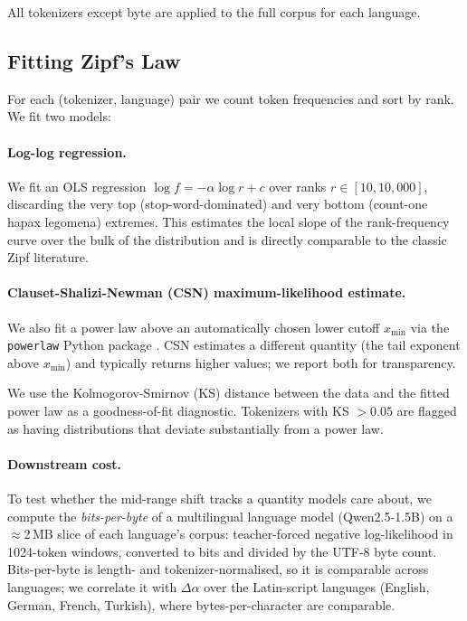 \documentclass{article}
\begin{document}
All tokenizers except byte are applied to the full corpus for each language.

\subsection{Fitting Zipf's Law}
\label{sec:fitting}

For each (tokenizer, language) pair we count token frequencies and sort by rank. We
fit two models:

\paragraph{Log-log regression.} We fit an OLS regression
$\log f = -\alpha \log r + c$ over ranks $r \in [10, 10{,}000]$, discarding the very
top (stop-word-dominated) and very bottom (count-one hapax legomena) extremes. This
estimates the local slope of the rank-frequency curve over the bulk of the distribution
and is directly comparable to the classic Zipf literature.

\paragraph{Clauset-Shalizi-Newman (CSN) maximum-likelihood estimate.} We also fit a
power law above an automatically chosen lower cutoff $x_{\min}$ via the \texttt{powerlaw}
Python package \citep{clauset2009}. CSN estimates a different quantity (the tail exponent
above $x_{\min}$) and typically returns higher values; we report both for transparency.

We use the Kolmogorov-Smirnov (KS) distance between the data and the fitted power law
as a goodness-of-fit diagnostic. Tokenizers with KS $> 0.05$ are flagged as having
distributions that deviate substantially from a power law.

\paragraph{Downstream cost.} To test whether the mid-range shift tracks a quantity
models care about, we compute the \emph{bits-per-byte} of a multilingual language model
(Qwen2.5-1.5B) on a $\approx$2\,MB slice of each language's corpus: teacher-forced
negative log-likelihood in 1024-token windows, converted to bits and divided by the
UTF-8 byte count. Bits-per-byte is length- and tokenizer-normalised, so it is comparable
across languages; we correlate it with $\Delta\alpha$ over the Latin-script languages
(English, German, French, Turkish), where bytes-per-character are comparable.
\end{document}
